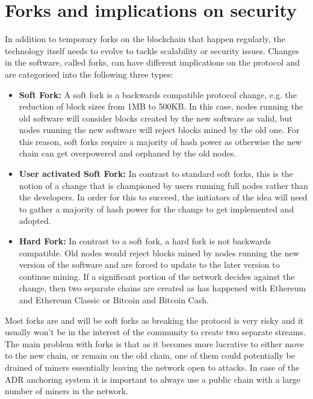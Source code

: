 \documentclass[12pt,msc,a4paper,oneside]{ucl_thesis}
\begin{document}
\section{Forks and implications on security}
In addition to temporary forks on the blockchain that happen regularly, the technology itself needs to evolve to tackle scalability or security issues. Changes in the software, called forks, can have different implications on the protocol and are categorised into the following three types\cite{coindesk:bitcoin_forks}:
\begin{itemize}
    \item\textbf{Soft Fork:} A soft fork is a backwards compatible protocol change, e.g. the reduction of block sizes from 1MB to 500KB. In this case, nodes running the old software will consider blocks created by the new software as valid, but nodes running the new software will reject blocks mined by the old one. For this reason, soft forks require a majority of hash power as otherwise the new chain can get overpowered and orphaned by the old nodes.

    \item\textbf{User activated Soft Fork:} In contrast to standard soft forks, this is the notion of a change that is championed by users running full nodes rather than the developers. In order for this to succeed, the initiators of the idea will need to gather a majority of hash power for the change to get implemented and adopted.

    \item\textbf{Hard Fork:} In contrast to a soft fork, a hard fork is not backwards compatible. Old nodes would reject blocks mined by nodes running the new version of the software and are forced to update to the later version to continue mining. If a significant portion of the network decides against the change, then two separate chains are created as has happened with Ethereum and Ethereum Classic or Bitcoin and Bitcoin Cash.
\end{itemize}
Most forks are and will be soft forks as breaking the protocol is very risky and it usually won't be in the interest of the community to create two separate streams. The main problem with forks is that as it becomes more lucrative to either move to the new chain, or remain on the old chain, one of them could potentially be drained of miners essentially leaving the network open to attacks. In case of the ADR anchoring system it is important to always use a public chain with a large number of miners in the network.
\end{document}
